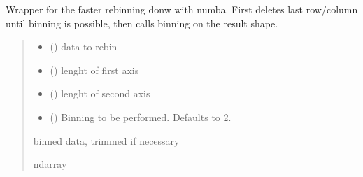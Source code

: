 \documentclass[letterpaper,10pt,english]{sphinxmanual}
\begin{document}
\begin{fulllineitems}
\label{\detokenize{micropolarray.processing:micropolarray.processing.rebin.micropolarray_rebin}}
\pysigstartsignatures
{}
\pysigstopsignatures
\sphinxAtStartPar
Wrapper for the faster rebinning donw with numba. First deletes last row/column until binning is possible, then calls binning on the result shape.
\begin{quote}\begin{description}
\begin{itemize}
\item {} 
\sphinxAtStartPar
{} () \textendash{} data to rebin

\item {} 
\sphinxAtStartPar
{} () \textendash{} lenght of first axis

\item {} 
\sphinxAtStartPar
{} () \textendash{} lenght of second axis

\item {} 
\sphinxAtStartPar
{} (\sphinxstyleliteralemphasis{\sphinxupquote{, }}) \textendash{} Binning to be performed. Defaults to 2.

\end{itemize}

\sphinxAtStartPar
binned data, trimmed if necessary

\sphinxAtStartPar
ndarray

\end{description}\end{quote}

\end{fulllineitems}

\end{document}

